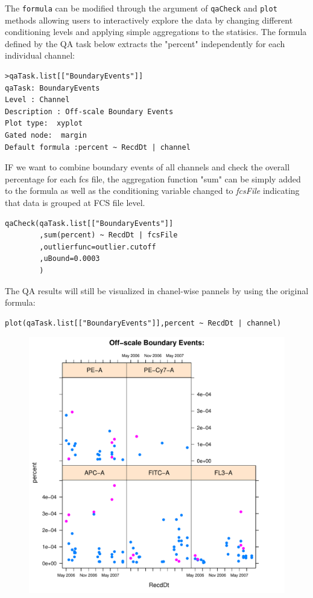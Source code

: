 \documentclass[10pt]{bmc_article}
\newenvironment{bmcformat}{\baselineskip20pt\sloppy\setboolean{publ}{false}}{\baselineskip20pt\sloppy}
\begin{document}
\begin{bmcformat}
The \texttt{formula} can be modified through the argument of \texttt{qaCheck}
and \texttt{plot} methods allowing users to interactively explore the data by
changing different conditioning levels and applying simple aggregations to the
statisics. The formula defined by the QA task below extracts the
"percent" independently for each individual channel:
\begin{verbatim}
>qaTask.list[["BoundaryEvents"]]
qaTask: BoundaryEvents 
Level : Channel 
Description : Off-scale Boundary Events 
Plot type:  xyplot
Gated node:  margin
Default formula :percent ~ RecdDt | channel
\end{verbatim}
IF we want to combine boundary events of all channels and
check the overall percentage for each fcs file, the aggregation function "sum"
can be simply added to the formula as well as the conditioning variable changed
to \emph{fcsFile} indicating that data is grouped at FCS file level.
\begin{verbatim}
qaCheck(qaTask.list[["BoundaryEvents"]]
		,sum(percent) ~ RecdDt | fcsFile
		,outlierfunc=outlier.cutoff
		,uBound=0.0003
		)
\end{verbatim}
The QA results will still be visualized in chanel-wise pannels by using the
original formula:
\begin{verbatim}		
plot(qaTask.list[["BoundaryEvents"]],percent ~ RecdDt | channel)
\end{verbatim}
\begin{figure}[h]
\includegraphics[totalheight=120mm]{image/BoundaryEvents.pdf}

\end{figure}
\end{bmcformat}
\end{document}
